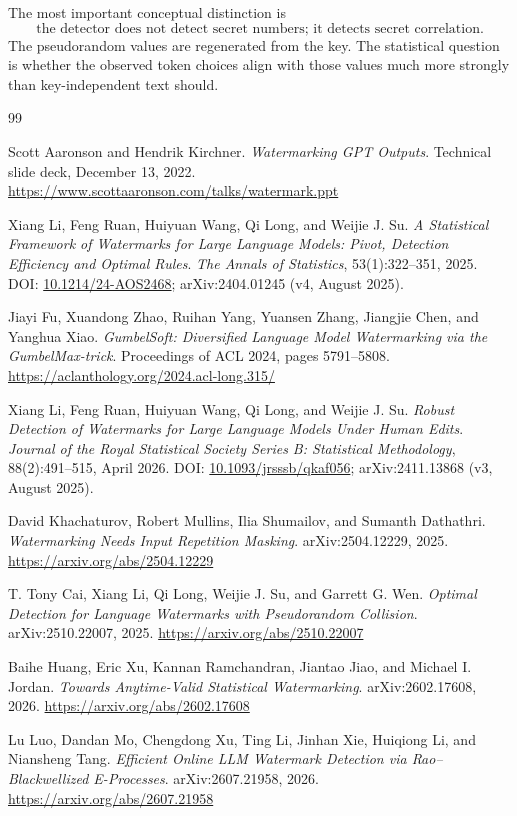 \documentclass[11pt]{article}
\begin{document}
The most important conceptual distinction is
\[
\text{the detector does not detect secret numbers; it detects secret correlation.}
\]
The pseudorandom values are regenerated from the key. The statistical question is whether the observed token choices align with those values much more strongly than key-independent text should.

\newpage
\begin{thebibliography}{99}

Scott Aaronson and Hendrik Kirchner.
\newblock \emph{Watermarking GPT Outputs}.
\newblock Technical slide deck, December 13, 2022.
\newblock \url{https://www.scottaaronson.com/talks/watermark.ppt}

Xiang Li, Feng Ruan, Huiyuan Wang, Qi Long, and Weijie J. Su.
\newblock \emph{A Statistical Framework of Watermarks for Large Language Models: Pivot, Detection Efficiency and Optimal Rules}.
\newblock \emph{The Annals of Statistics}, 53(1):322--351, 2025.
\newblock DOI: \href{https://doi.org/10.1214/24-AOS2468}{10.1214/24-AOS2468}; arXiv:2404.01245 (v4, August 2025).

Jiayi Fu, Xuandong Zhao, Ruihan Yang, Yuansen Zhang, Jiangjie Chen, and Yanghua Xiao.
\newblock \emph{GumbelSoft: Diversified Language Model Watermarking via the GumbelMax-trick}.
\newblock Proceedings of ACL 2024, pages 5791--5808.
\newblock \url{https://aclanthology.org/2024.acl-long.315/}

Xiang Li, Feng Ruan, Huiyuan Wang, Qi Long, and Weijie J. Su.
\newblock \emph{Robust Detection of Watermarks for Large Language Models Under Human Edits}.
\newblock \emph{Journal of the Royal Statistical Society Series B: Statistical Methodology}, 88(2):491--515, April 2026.
\newblock DOI: \href{https://doi.org/10.1093/jrsssb/qkaf056}{10.1093/jrsssb/qkaf056}; arXiv:2411.13868 (v3, August 2025).

David Khachaturov, Robert Mullins, Ilia Shumailov, and Sumanth Dathathri.
\newblock \emph{Watermarking Needs Input Repetition Masking}.
\newblock arXiv:2504.12229, 2025.
\newblock \url{https://arxiv.org/abs/2504.12229}

T. Tony Cai, Xiang Li, Qi Long, Weijie J. Su, and Garrett G. Wen.
\newblock \emph{Optimal Detection for Language Watermarks with Pseudorandom Collision}.
\newblock arXiv:2510.22007, 2025.
\newblock \url{https://arxiv.org/abs/2510.22007}

Baihe Huang, Eric Xu, Kannan Ramchandran, Jiantao Jiao, and Michael I. Jordan.
\newblock \emph{Towards Anytime-Valid Statistical Watermarking}.
\newblock arXiv:2602.17608, 2026.
\newblock \url{https://arxiv.org/abs/2602.17608}

Lu Luo, Dandan Mo, Chengdong Xu, Ting Li, Jinhan Xie, Huiqiong Li, and Niansheng Tang.
\newblock \emph{Efficient Online LLM Watermark Detection via Rao--Blackwellized E-Processes}.
\newblock arXiv:2607.21958, 2026.
\newblock \url{https://arxiv.org/abs/2607.21958}

\end{thebibliography}
\end{document}

